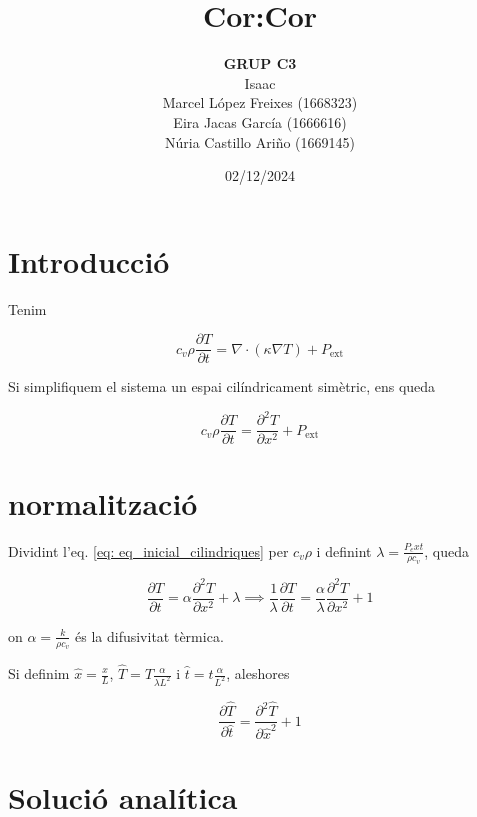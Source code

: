 \documentclass[11pt]{article}
\title{\Huge\bfseries Cor:Cor \\[1ex] \Large}
\author{\begin{tabular}{c}
\textbf{GRUP C3} \\
Isaac \\
Marcel López Freixes (1668323) \\
Eira Jacas García (1666616) \\
Núria Castillo Ariño (1669145)
\end{tabular}}
\date{02/12/2024}
\begin{document}
\maketitle

\section{Introducció}


Tenim 

\begin{equation}
    c_v \rho \frac{\partial T}{\partial t} = \nabla \cdot (\kappa \nabla T) + P_{\text{ext}}
\label{eq: eq_inicial}
\end{equation}


Si simplifiquem el sistema un espai cilíndricament simètric, ens queda


\begin{equation}
    c_v \rho \frac{\partial T}{\partial t} = \frac{\partial^2 T}{\partial x^2} + P_{\text{ext}}
\label{eq: eq_inicial_cilindriques}
\end{equation}
\section{normalització}

Dividint l'eq. \eqref{eq: eq_inicial_cilindriques} per $c_v\rho$ i definint $\lambda=\frac{P_ext}{\rho c_v}$, queda

\begin{equation}
    \frac{\partial T}{\partial t} = \alpha \frac{\partial^2 T}{\partial x^2} + \lambda \implies \frac{1}{\lambda}\frac{\partial T}{\partial t} = \frac{\alpha}{\lambda} \frac{\partial^2 T}{\partial x^2} + 1
\label{eq: eq_entre_rhocv}
\end{equation}

on $\alpha=\frac{k}{\rho c_v}$ és la difusivitat tèrmica.

Si definim $\hat{x}=\frac{x}{L}$, $\hat{T}=T \frac{\alpha}{\lambda L^2}$ i $\hat{t}=t\frac{\alpha}{L^2}$, aleshores

\begin{equation}
    \frac{\partial \hat{T}}{\partial \hat{t}} = \frac{\partial^2 \hat{T}}{\partial \hat{x}^2} + 1
\label{eq: eq_normalitzada}
\end{equation}

\section{Solució analítica}
\end{document}
